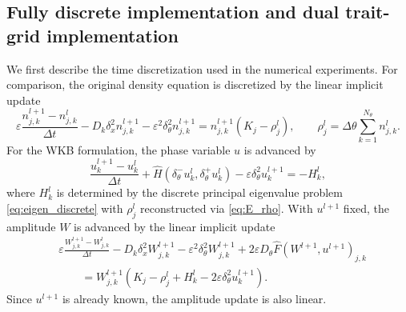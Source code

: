 \documentclass[11pt]{article}
\numberwithin{equation}{section}
\begin{document}
\subsection{Fully discrete implementation and dual trait-grid implementation}
\label{subsec:dual_grid}

We first describe the time discretization used in the numerical experiments.
For comparison, the original density equation is discretized by the linear
implicit update
\begin{equation}\label{eq:direct_density_fully}
    \varepsilon
    \frac{n_{j,k}^{l+1}-n_{j,k}^l}{\Delta t}
    -
    D_k\delta_x^2n_{j,k}^{l+1}
    -
    \varepsilon^2\delta_\theta^2n_{j,k}^{l+1}
    =
    n_{j,k}^{l+1}(K_j-\rho_j^l),
    \qquad
    \rho_j^l=\Delta\theta\sum_{k=1}^{N_\theta} n_{j,k}^l .
\end{equation}
For the WKB formulation, the phase variable $u$ is advanced by
\begin{equation}\label{eq:wkb_fully_u}
    \frac{u_k^{l+1}-u_k^l}{\Delta t}
    +
    \widehat H(\delta_\theta^-u_k^l,\delta_\theta^+u_k^l)
    -
    \varepsilon\delta_\theta^2u_k^{l+1}
    =
    -H_k^l, 
\end{equation}
where $H_k^l$ is determined by the discrete
principal eigenvalue problem \eqref{eq:eigen_discrete} 
with $ \rho_j^l$ reconstructed via \eqref{eq:E_rho}. 
With \(u^{l+1}\) fixed, the amplitude $W$ is advanced by the linear implicit
update
\begin{equation}\label{eq:wkb_fully_W}
\begin{aligned}
    &\varepsilon
    \frac{W_{j,k}^{l+1}-W_{j,k}^l}{\Delta t}
    -
    D_k\delta_x^2W_{j,k}^{l+1}
    -
    \varepsilon^2\delta_\theta^2W_{j,k}^{l+1}
    +
    2\varepsilon D_\theta\widehat F(W^{l+1},u^{l+1})_{j,k}
    \\
    &\qquad
    =
    W_{j,k}^{l+1}
    \left(
        K_j-\rho_j^l+H_k^l
        -2\varepsilon\delta_\theta^2u_k^{l+1}
    \right).
\end{aligned}
\end{equation}
Since \(u^{l+1}\) is already known, the amplitude update is also linear.  
\end{document}
